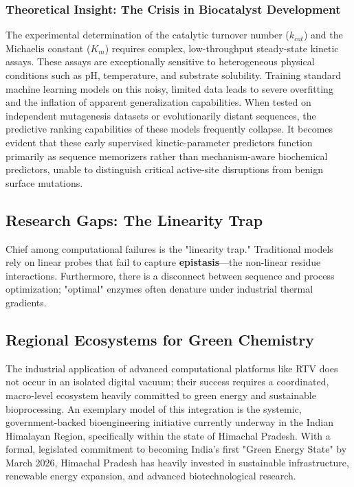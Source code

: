 \documentclass[11pt,a4paper,oneside]{article}
\begin{document}
\subsubsection{Theoretical Insight: The Crisis in Biocatalyst Development}
The experimental determination of the catalytic turnover number ($k_{cat}$) and the Michaelis constant ($K_m$) requires complex, low-throughput steady-state kinetic assays. These assays are exceptionally sensitive to heterogeneous physical conditions such as pH, temperature, and substrate solubility. Training standard machine learning models on this noisy, limited data leads to severe overfitting and the inflation of apparent generalization capabilities. When tested on independent mutagenesis datasets or evolutionarily distant sequences, the predictive ranking capabilities of these models frequently collapse. It becomes evident that these early supervised kinetic-parameter predictors function primarily as sequence memorizers rather than mechanism-aware biochemical predictors, unable to distinguish critical active-site disruptions from benign surface mutations.

\subsection{Research Gaps: The Linearity Trap}
Chief among computational failures is the "linearity trap." Traditional models rely on linear probes that fail to capture \textbf{epistasis}—the non-linear residue interactions. Furthermore, there is a disconnect between sequence and process optimization; "optimal" enzymes often denature under industrial thermal gradients.

\subsection{Regional Ecosystems for Green Chemistry}
The industrial application of advanced computational platforms like RTV does not occur in an isolated digital vacuum; their success requires a coordinated, macro-level ecosystem heavily committed to green energy and sustainable bioprocessing. An exemplary model of this integration is the systemic, government-backed bioengineering initiative currently underway in the Indian Himalayan Region, specifically within the state of Himachal Pradesh. With a formal, legislated commitment to becoming India's first "Green Energy State" by March 2026, Himachal Pradesh has heavily invested in sustainable infrastructure, renewable energy expansion, and advanced biotechnological research. 
\end{document}
